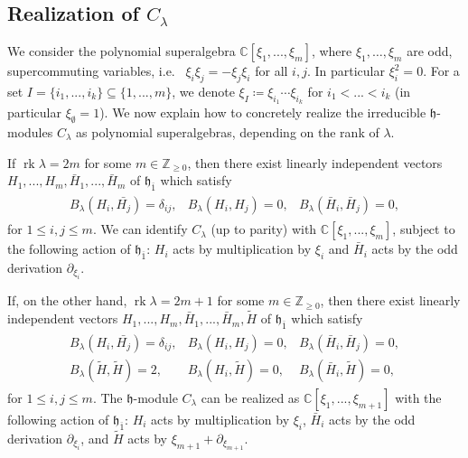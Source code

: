 \documentclass[12pt, a4paper, reqno]{amsart}
\def\ol{\overline}
\def\rk{\operatorname{rk}}
\theoremstyle{definition}
\theoremstyle{definition}
\theoremstyle{definition}
\numberwithin{theorem}{section}
\numberwithin{lemma}{section}
\numberwithin{remark}{section}
\numberwithin{definition}{section}
\numberwithin{corollary}{section}
\numberwithin{proposition}{section}
\numberwithin{example}{section}
\begin{document}
	\subsection{Realization of \(C_{\lambda}\)}\label{subsection-realization-irreducible}
	
	We consider the polynomial superalgebra \(\mathbb{C}[\xi_1,...,\xi_m]\), where $\xi_1,\dots,\xi_m$ are odd, supercommuting variables, i.e.~ \(\xi_i\xi_j = -\xi_j\xi_i\) for all \(i,j\). In particular \(\xi_i^2 = 0\). For a set \(I = \{i_1,...,i_k\} \subseteq \{1,...,m\}\), we denote \(\xi_I \coloneq \xi_{i_1}\cdots \xi_{i_k}\) for \(i_1<...<i_k\) (in particular \(\xi_\emptyset = 1\)). We now explain how to concretely realize the irreducible \(\mathfrak{h}\)-modules \(C_{\lambda}\) as polynomial superalgebras, depending on the rank of \(\lambda\). 
	
	
	If \(\rk\lambda = 2m\) for some \(m \in \mathbb{Z}_{\geq0}\), then there exist linearly independent vectors \linebreak \(H_1,...,H_m,\bar{H}_1,...,\bar{H}_m\) of \(\mathfrak{h}_{\ol{1}}\) which satisfy 
	\begin{align*}
		\begin{array}{ccc}
			B_\lambda(H_i,\bar{H_j}) = \delta_{ij}, & B_\lambda(H_i,H_j) = 0, & B_\lambda(\bar{H}_i,\bar{H}_j)=0,
		\end{array}
	\end{align*}
	for \(1\leq i,j \leq m\). We can identify \(C_\lambda\) (up to parity) with \(\mathbb{C}[\xi_1,...,\xi_m]\), subject to the following action of \(\mathfrak{h}_{\ol{1}}\): \(H_i\) acts by multiplication by \(\xi_i\) and \(\bar{H}_i\) acts by the odd derivation \(\partial_{\xi_i}\). \par
	If, on the other hand, \(\rk\lambda = 2m+1\) for some \(m \in \mathbb{Z}_{\geq 0}\), then there exist linearly independent vectors \(H_1,...,H_m,\bar{H}_1,...,\bar{H}_m,\tilde{H}\) of \(\mathfrak{h}_{\ol{1}}\) which satisfy 
	\begin{align*}
		\begin{array}{ccc}
			B_\lambda(H_i,\bar{H_j}) = \delta_{ij}, & B_\lambda(H_i,H_j) = 0, & B_\lambda(\bar{H}_i,\bar{H}_j)=0, \\
			B_\lambda(\tilde{H},\tilde{H}) = 2, & B_\lambda(H_i,\tilde{H}) = 0, & B_\lambda(\bar{H}_i,\tilde{H}) = 0,
		\end{array}
	\end{align*}
	for \(1\leq i,j \leq m\). The \(\mathfrak{h}\)-module \(C_\lambda\) can be realized as \(\mathbb{C}[\xi_1,...,\xi_{m+1}]\) with the following action of \(\mathfrak{h}_{\ol{1}}\): \(H_i\) acts by multiplication by \(\xi_i\), \(\bar{H}_i\) acts by the odd derivation \(\partial_{\xi_i}\), and \(\tilde{H}\) acts by \(\xi_{m+1}+\partial_{\xi_{m+1}}\).
	
\end{document}
